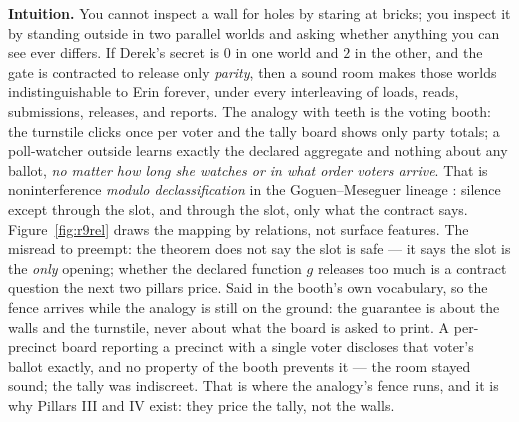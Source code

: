 \documentclass[11pt,a4paper]{article}
\begin{document}
\textbf{Intuition.} You cannot inspect a wall for holes by staring at bricks; you inspect it by standing outside in two parallel
worlds and asking whether anything you can see ever differs. If Derek's secret is $0$ in one world and $2$ in the other, and the
gate is contracted to release only \emph{parity}, then a sound room makes those worlds indistinguishable to Erin forever, under
every interleaving of loads, reads, submissions, releases, and reports. The analogy with teeth is the voting booth: the turnstile
clicks once per voter and the tally board shows only party totals; a poll-watcher outside learns exactly the declared aggregate
and nothing about any ballot, \emph{no matter how long she watches or in what order voters arrive}. That is noninterference
\emph{modulo declassification} in the Goguen--Meseguer lineage \cite{goguen-meseguer-82,goguen-meseguer-84}: silence except
through the slot, and through the slot, only what the contract says. Figure~\ref{fig:r9rel} draws the mapping by relations, not
surface features. The misread to preempt: the theorem does not say the slot is safe --- it says the slot is the \emph{only}
opening; whether the declared function $g$ releases too much is a contract question the next two pillars price. Said in the
booth's own vocabulary, so the fence arrives while the analogy is still on the ground: the guarantee is about the walls and the
turnstile, never about what the board is asked to print. A per-precinct board reporting a precinct with a single voter discloses
that voter's ballot exactly, and no property of the booth prevents it --- the room stayed sound; the tally was indiscreet. That is
where the analogy's fence runs, and it is why Pillars III and IV exist: they price the tally, not the walls.


\end{document}
